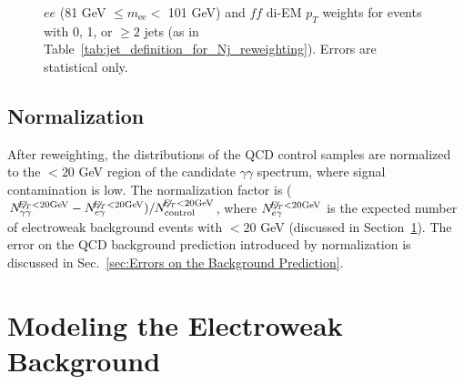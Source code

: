 \documentclass[dissertation_bw.tex]{subfiles}
\begin{document}
\begin{figure}
	\hspace{1cm}
	\caption{$ee$ (81 GeV $\leq m_{\mathrm{ee}} <$ 101 GeV) and $\mathit{ff}$ di-EM $p_{T}$ weights for events with 0, 1, or $\geq 2$ jets (as in Table~\ref{tab:jet_definition_for_Nj_reweighting}).  Errors are statistical only.}
	\label{fig:dijet_pT_weights}
\end{figure}

\subsection{Normalization}
\label{sec:Normalization}

After reweighting, the \MET distributions of the QCD control samples are normalized to the \MET $< 20$ GeV region of the candidate $\gamma\gamma$ \MET spectrum, where signal contamination is low.  The normalization factor is ($N_{\gamma\gamma}^{\not\!\! E_{T} < 20 \mathrm{GeV}} - N_{e\gamma}^{\not\!\! E_{T} < 20 \mathrm{GeV}})/N_{\mathrm{control}}^{\not\!\! E_{T} < 20 \mathrm{GeV}}$, where $N_{e\gamma}^{\not\!\! E_{T} < 20 \mathrm{GeV}}$ is the expected number of electroweak background events with \MET $< 20$ GeV (discussed in Section~\ref{sec:Modeling the Electroweak Background}).  The error on the QCD background prediction introduced by normalization is discussed in Sec.~\ref{sec:Errors on the Background Prediction}.

\section{Modeling the Electroweak Background}
\label{sec:Modeling the Electroweak Background}
\end{document}
